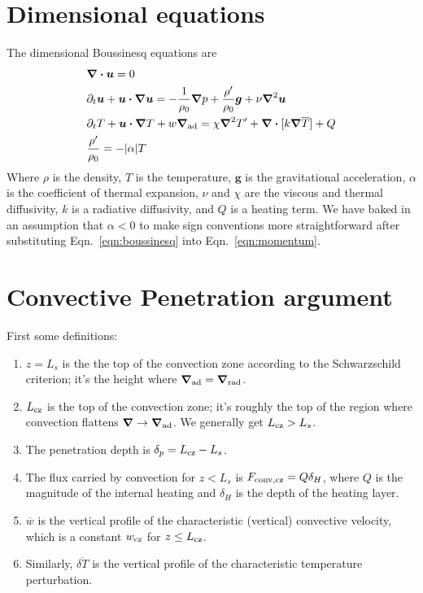 \documentclass[12pt]{article}
\renewcommand{\vec}[1]{\boldsymbol{#1}}
\renewcommand{\dot}{\vec{\cdot}}
\newcommand{\grad}{\vec{\nabla}}
\begin{document}
\section{Dimensional equations}
The dimensional Boussinesq equations are
\begin{align}
&\grad\dot\vec{u} = 0 \label{eqn:continuity} \\
&\partial_t \vec{u} + \vec{u}\dot\grad\vec{u} = -\frac{1}{\rho_0}\grad p + \frac{\rho'}{\rho_0}\vec{g} + \nu\grad^2 \vec{u} \label{eqn:momentum} \\
&\partial_t T + \vec{u}\dot\grad T + w \grad_{\rm{ad}} = \chi\grad^2 T' + \grad\dot[k \grad \overline{T}] + Q \label{eqn:temperature} \\
&\frac{\rho'}{\rho_0} = -|\alpha| T \label{eqn:boussinesq}
\end{align}
Where $\rho$ is the density, $T$ is the temperature, $\vec{g}$ is the gravitational acceleration, $\alpha$ is the coefficient of thermal expansion, $\nu$ and $\chi$ are the viscous and thermal diffusivity, $k$ is a radiative diffusivity, and $Q$ is a heating term.
We have baked in an assumption that $\alpha < 0$ to make sign conventions more straightforward after substituting Eqn.~\ref{eqn:boussinesq} into Eqn.~\ref{eqn:momentum}.

\section{Convective Penetration argument}
First some definitions:
\begin{enumerate}
\item $z=L_s$ is the the top of the convection zone according to the Schwarzschild criterion; it's the height where $\grad_{\rm{ad}} = \grad_{\rm{rad}}$.
\item $L_{\rm{cz}}$ is the top of the convection zone; it's roughly the top of the region where convection flattens $\grad \rightarrow \grad_{\rm{ad}}$.
We generally get $L_{\rm{cz}} > L_s$.
\item The penetration depth is $\delta_p = L_{\rm{cz}} - L_s$.
\item The flux carried by convection for $z < L_s$ is $F_{\rm{conv,cz}} = Q \delta_H$, where $Q$ is the magnitude of the internal heating and $\delta_H$ is the depth of the heating layer.
\item $\overline{w}$ is the vertical profile of the characteristic (vertical) convective velocity, which is a constant $w_{\rm{cz}}$ for $z \leq L_{\rm{cz}}$.
\item Similarly, $\overline{\delta T}$ is the vertical profile of the characteristic temperature perturbation.
\end{enumerate}
\end{document}
